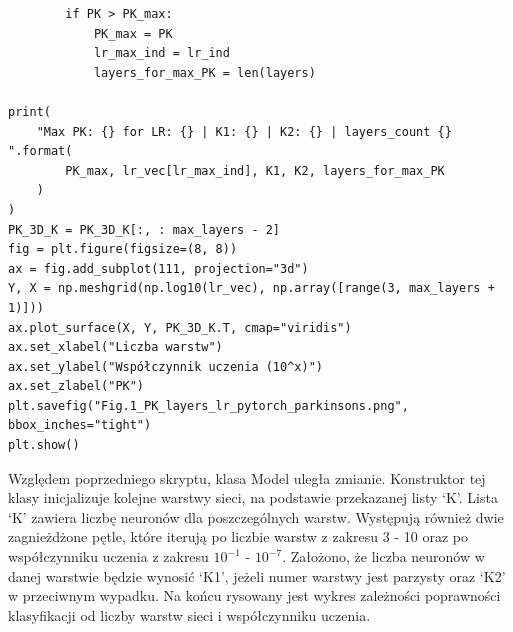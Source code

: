 \documentclass{article}
\begin{document}
\begin{verbatim}
        if PK > PK_max:
            PK_max = PK
            lr_max_ind = lr_ind
            layers_for_max_PK = len(layers)

print(
    "Max PK: {} for LR: {} | K1: {} | K2: {} | layers_count {} ".format(
        PK_max, lr_vec[lr_max_ind], K1, K2, layers_for_max_PK
    )
)
PK_3D_K = PK_3D_K[:, : max_layers - 2]
fig = plt.figure(figsize=(8, 8))
ax = fig.add_subplot(111, projection="3d")
Y, X = np.meshgrid(np.log10(lr_vec), np.array([range(3, max_layers + 1)]))
ax.plot_surface(X, Y, PK_3D_K.T, cmap="viridis")
ax.set_xlabel("Liczba warstw")
ax.set_ylabel("Współczynnik uczenia (10^x)")
ax.set_zlabel("PK")
plt.savefig("Fig.1_PK_layers_lr_pytorch_parkinsons.png", bbox_inches="tight")
plt.show()
\end{verbatim}
\newpage
Względem poprzedniego skryptu, klasa Model uległa zmianie.
Konstruktor tej klasy inicjalizuje kolejne warstwy sieci, na podstawie przekazanej listy `K'.
Lista `K' zawiera liczbę neuronów dla poszczególnych warstw.
Występują również dwie zagnieżdżone pętle, które iterują po liczbie warstw z zakresu 3 - 10 oraz po współczynniku uczenia z zakresu $10^{-1}$ - $10^{-7}$.
Założono, że liczba neuronów w danej warstwie będzie wynosić `K1', jeżeli numer warstwy jest parzysty oraz `K2' w przeciwnym wypadku.
Na końcu rysowany jest wykres zależności poprawności klasyfikacji od liczby warstw sieci i współczynniku uczenia.
\end{document}
